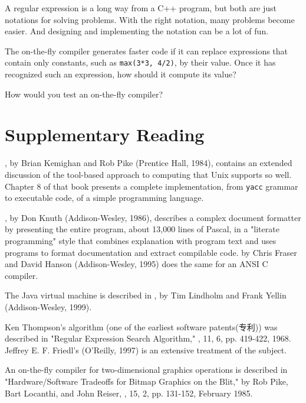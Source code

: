 A regular expression is a long way from a C++ program, but both are just
notations for solving problems. With the right notation, many problems
become easier.  And designing and implementing the notation can be a lot of
fun.

\begin{exercise}
    The on-the-fly compiler generates faster code if it can replace
    expressions that contain only constants, such as \verb'max(3*3, 4/2)',
    by their value. Once it has recognized such an expression, how should
    it compute its value?
\end{exercise}

\begin{exercise}
    How would you test an on-the-fly compiler?
\end{exercise}

\section*{Supplementary Reading}

, by Brian Kemighan and Rob Pike
(Prentice Hall, 1984), contains an extended discussion of the tool-based
approach to computing that Unix supports so well. Chapter 8 of that book
presents a complete implementation, from \verb'yacc' grammar to executable
code, of a simple programming language.

, by Don Knuth (Addison-Wesley, 1986), describes
a complex document formatter by presenting the entire program, about 13,000
lines of Pascal, in a "literate programming" style that combines
explanation with program text and uses programs to format documentation and
extract compilable code.  by Chris Fraser and David Hanson (Addison-Wesley, 1995)
does the same for an ANSI C compiler.

The Java virtual machine is described in , by Tim Lindholm and Frank Yellin
(Addison-Wesley, 1999).

Ken Thompson's algorithm (one of the earliest software patents(专利)) was
described in "Regular Expression Search Algorithm,"
, 11, 6, pp.  419-422, 1968. Jeffrey E.
F. Friedl's  (O'Reilly, 1997) is an
extensive treatment of the subject.

An on-the-fly compiler for two-dimensional graphics operations is described
in "Hardware/Software Tradeoffs for Bitmap Graphics on the Blit," by Rob
Pike, Bart Locanthi, and John Reiser, , 15, 2, pp.  131-152, February 1985.
